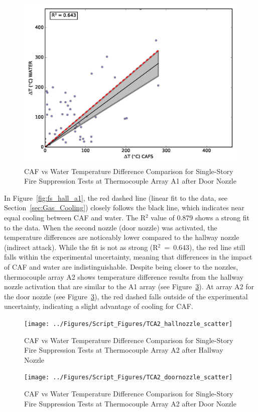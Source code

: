 \documentclass[12pt,oneside]{book}
\begin{document}
\begin{figure}[!ht]
	\includegraphics[width=.7\columnwidth]{../Figures/Script_Figures/TCA1_doornozzle_scatter}
	\caption{CAF vs Water Temperature Difference Comparison for Single-Story Fire Suppression Tests at Thermocouple Array A1 after Door Nozzle}
	\label{fig:fs_door_a1}
\end{figure}

In Figure~\ref{fig:fs_hall_a1}, the red dashed line (linear fit to the data, see Section~\ref{sec:Gas_Cooling}) closely follows the black line, which indicates near equal cooling between CAF and water. The R$^2$ value of 0.879 shows a strong fit to the data. When the second nozzle (door nozzle) was activated, the temperature differences are noticeably lower compared to the hallway nozzle (indirect attack). While the fit is not as strong (R$^2$~=~0.643), the red line still falls within the experimental uncertainty, meaning that differences in the impact of CAF and water are indistinguishable. Despite being closer to the nozzles, thermocouple array A2 shows temperature difference results from the hallway nozzle activation that are similar to the A1 array (see Figure~\ref{fig:fs_door_a2}). At array A2 for the door nozzle (see Figure~\ref{fig:fs_door_a2}), the red dashed falls outside of the experimental uncertainty, indicating a slight advantage of cooling for CAF.

\begin{figure}[!ht]
	\texttt{[image: ../Figures/Script\_Figures/TCA2\_hallnozzle\_scatter]}
	\caption{CAF vs Water Temperature Difference Comparison for Single-Story Fire Suppression Tests at Thermocouple Array A2 after Hallway Nozzle}
	\label{fig:fs_hall_a2}
\end{figure}

\begin{figure}[!ht]
	\texttt{[image: ../Figures/Script\_Figures/TCA2\_doornozzle\_scatter]}
	\caption{CAF vs Water Temperature Difference Comparison for Single-Story Fire Suppression Tests at Thermocouple Array A2 after Door Nozzle}
	\label{fig:fs_door_a2}
\end{figure}
\end{document}

